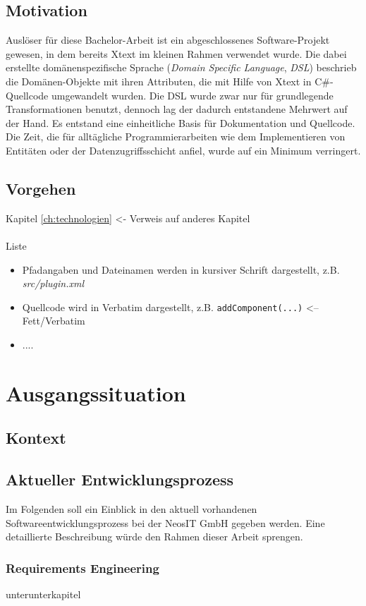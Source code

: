 \documentclass[a4paper,12pt]{scrreprt}
\begin{document}
\section{Motivation}
Auslöser für diese Bachelor-Arbeit ist ein abgeschlossenes Software-Projekt gewesen, in dem bereits Xtext im kleinen Rahmen verwendet wurde.
Die dabei erstellte domänenspezifische Sprache (\textit{Domain Specific Language}, \textit{DSL}) beschrieb die Domänen-Objekte mit ihren Attributen, die mit Hilfe von Xtext in C\#-Quellcode umgewandelt wurden.
Die DSL wurde zwar nur für grundlegende Transformationen benutzt, dennoch lag der dadurch entstandene Mehrwert auf der Hand. Es entstand eine einheitliche Basis für Dokumentation und Quellcode. Die Zeit, die für alltägliche Programmierarbeiten wie dem Implementieren von Entitäten oder der Datenzugriffsschicht anfiel, wurde auf ein Minimum verringert.
\section{Vorgehen}
 Kapitel \ref{ch:technologien}  <- Verweis auf anderes Kapitel
\\
\\
Liste
\begin{itemize}
	\item Pfadangaben und Dateinamen werden in kursiver Schrift dargestellt, z.B. \textit{src/plugin.xml}
	\item Quellcode wird in Verbatim dargestellt, z.B. \texttt{addComponent(...)}   <--   Fett/Verbatim
	\item ....
\end{itemize}

\chapter{Ausgangssituation}
\section{Kontext}

\section{Aktueller Entwicklungsprozess}
Im Folgenden soll ein Einblick in den aktuell vorhandenen Softwareent\-wick\-lungs\-prozess bei der NeosIT GmbH gegeben werden. Eine detaillierte Beschreibung würde den Rahmen dieser Arbeit sprengen.

\subsection{Requirements Engineering}
 unterunterkapitel
\end{document}
